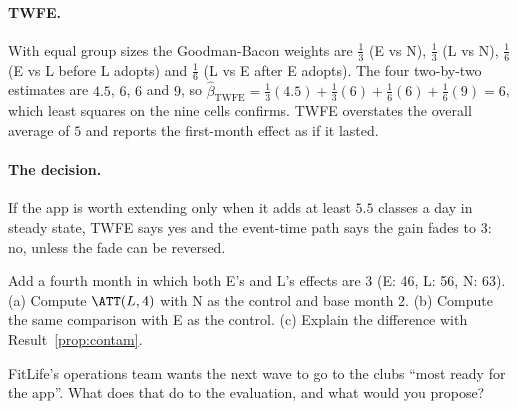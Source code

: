\documentclass[11pt]{article}
\begin{document}
\paragraph{TWFE.} With equal group sizes the Goodman-Bacon weights are $\tfrac13$ (E vs N), $\tfrac13$ (L vs N), $\tfrac16$ (E vs L before L adopts) and $\tfrac16$ (L vs E after
E adopts). The four two-by-two estimates are $4.5$, $6$, $6$ and $9$, so
$\hat\beta_{\text{TWFE}} = \tfrac13(4.5) + \tfrac13(6) + \tfrac16(6) + \tfrac16(9) = 6$, which least squares on the nine cells confirms. TWFE overstates the overall average of
$5$ and reports the first-month effect as if it lasted.

\paragraph{The decision.} If the app is worth extending only when it adds at least $5.5$ classes a day in steady state, TWFE says yes and the event-time path
says the gain fades to $3$: no, unless the fade can be reversed.

\begin{exercise}[computation]
Add a fourth month in which both E's and L's effects are $3$ (E: 46, L: 56, N: 63). (a) Compute $\ATT(L,4)$ with N as the control and base month 2.
(b) Compute the same comparison with E as the control. (c) Explain the difference with Result~\ref{prop:contam}.
\end{exercise}

\begin{exercise}[judgement]
FitLife's operations team wants the next wave to go to the clubs ``most ready for the app''. What does that do to the evaluation, and what would you
propose?
\end{exercise}

\sectionthree
\end{document}
